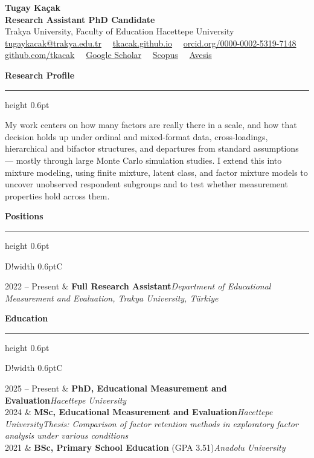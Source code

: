 \documentclass[10pt,a4paper]{article}
\newcommand{\me}[1]{\textbf{\color{headwhite}#1}}
\newcommand{\cvsection}[1]{%
  \vspace{10pt}%
  {\color{headwhite}\large\bfseries #1}\par
  \vspace{2pt}
  {\color{rulegray}\hrule height 0.6pt}
  \vspace{7pt}
}
\newenvironment{cvtable}{%
  \begin{longtable}{D!{\color{rulegray}\vrule width 0.6pt\hspace{4pt}}C}
}{%
  \end{longtable}
}
\newcommand{\cvrow}[2]{#1 & #2 \\[7pt]}
\begin{document}
\thispagestyle{fancy}

\begin{center}
{\color{headwhite}\Huge\bfseries Tugay Ka\c{c}ak}\\[6pt]
{\color{headwhite}\bfseries Research Assistant \textbar{} PhD Candidate}\\[1pt]
{\color{bodygray}Trakya University, Faculty of Education \textbar{} Hacettepe University}\\[5pt]
{\small\color{bodygray}
\href{mailto:tugaykacak@trakya.edu.tr}{\color{linkblue}tugaykacak@trakya.edu.tr}~\textbar~%
\href{https://tkacak.github.io}{\color{linkblue}tkacak.github.io}~\textbar~%
\href{https://orcid.org/0000-0002-5319-7148}{\color{linkblue}orcid.org/0000-0002-5319-7148}}\\[2pt]
{\small\color{bodygray}
\href{https://github.com/tkacak}{\color{linkblue}github.com/tkacak}~\textbar~%
\href{https://scholar.google.com/citations?user=-MLgpSEAAAAJ}{\color{linkblue}Google Scholar}~\textbar~%
\href{https://www.scopus.com/authid/detail.uri?authorId=58979529600}{\color{linkblue}Scopus}~\textbar~%
\href{https://avesis.trakya.edu.tr/tugaykacak}{\color{linkblue}Avesis}}
\end{center}

\cvsection{Research Profile}
My work centers on how many factors are really there in a scale, and how that decision holds up under ordinal and mixed-format data, cross-loadings, hierarchical and bifactor structures, and departures from standard assumptions --- mostly through large Monte Carlo simulation studies. I extend this into mixture modeling, using finite mixture, latent class, and factor mixture models to uncover unobserved respondent subgroups and to test whether measurement properties hold across them.

\cvsection{Positions}
\begin{cvtable}
\cvrow{2022 -- Present}{\me{Full Research Assistant}\newline \textcolor{mutedgray}{\textit{Department of Educational Measurement and Evaluation, Trakya University, T\"urkiye}}}
\end{cvtable}

\cvsection{Education}
\begin{cvtable}
\cvrow{2025 -- Present}{\me{PhD, Educational Measurement and Evaluation}\newline \textcolor{mutedgray}{\textit{Hacettepe University}}}
\cvrow{2024}{\me{MSc, Educational Measurement and Evaluation}\newline \textcolor{mutedgray}{\textit{Hacettepe University}}\newline \textcolor{mutedgray}{\textit{Thesis: Comparison of factor retention methods in exploratory factor analysis under various conditions}}}
\cvrow{2021}{\me{BSc, Primary School Education} (GPA 3.51)\newline \textcolor{mutedgray}{\textit{Anadolu University}}}
\end{cvtable}
\end{document}
